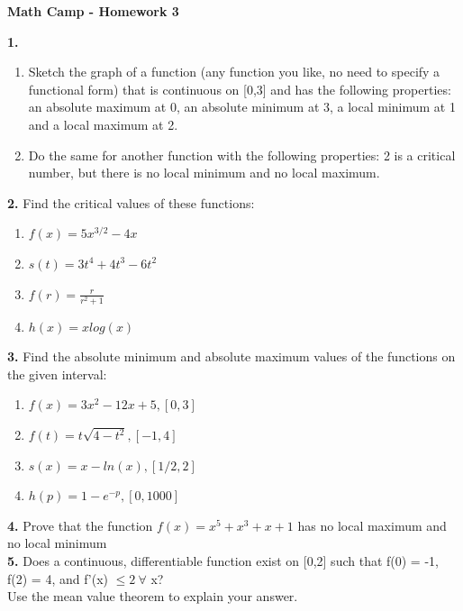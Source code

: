 \documentclass[12pt]{article}
\begin{document}
\centerline{\bf Math Camp - Homework 3}


\bigskip

\noindent \textbf{1.} 
\begin{enumerate}
\item Sketch the graph of a function (any function you like, no need to specify a functional form) that is continuous on [0,3] and has the following properties: an absolute maximum at 0, an absolute minimum at 3, a local minimum at 1 and a local maximum at 2.
\item Do the same for another function with the following properties: 2 is a critical number, but there is no local minimum and no  local maximum.
\end{enumerate}

\noindent \textbf{2.} Find the critical values of these functions:\\

\begin{multicols}{2}
\begin{enumerate}
\item $f(x) = 5x^{3/2} - 4x$
\item $s(t) = 3t^4 + 4t^3 - 6t^2$
\item $f(r) = \frac{r}{r^2 + 1}$
\item $h(x) = x log(x)$
\end{enumerate}
\end{multicols}

\noindent \textbf{3.} Find the absolute minimum and absolute maximum values of the functions on the given interval:\\

\begin{multicols}{2}
\begin{enumerate}
\item $f(x) = 3x^2 - 12x + 5, [0,3] $
\item $f(t) = t\sqrt{4 - t^2}, [-1,4]$
\item $s(x) = x - ln(x), [1/2, 2]$
\item $h(p) = 1 - e^{-p}, [0,1000]$
\end{enumerate}
\end{multicols}

\noindent \textbf{4.} Prove that the function $f(x) = x^5 + x^3 + x + 1$ has no local maximum and no local minimum\\

\noindent \textbf{5.} Does a continuous, differentiable function exist on [0,2] such that f(0) = -1, f(2) = 4, and f'(x) $\le 2 \  \forall$ x?\\
Use the mean value theorem to explain your answer.  
\end{document}
